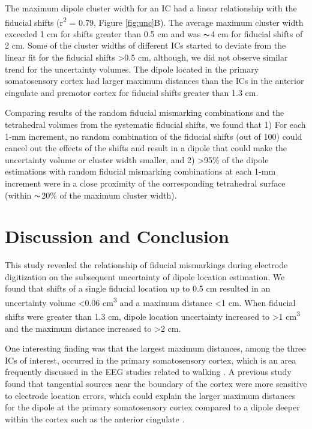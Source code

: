 \documentclass{UCF_ETD}
\newcommand{\tss}[1]{\textsuperscript{#1}}
\begin{document}
The maximum dipole cluster width for an IC had a linear relationship with the fiducial shifts (r\tss{2} = 0.79, Figure \ref{fig:unc}B). The average maximum cluster width exceeded 1 cm for shifts greater than 0.5 cm and was $\thicksim$4 cm for fiducial shifts of 2 cm. Some of the cluster widths of different ICs started to deviate from the linear fit for the fiducial shifts >0.5 cm, although, we did not observe similar trend for the uncertainty volumes. The dipole located in the primary somatosensory cortex had larger maximum distances than the ICs in the anterior cingulate and premotor cortex for fiducial shifts greater than 1.3 cm.

Comparing results of the random fiducial mismarking combinations and the tetrahedral volumes from the systematic fiducial shifts, we found that 1) For each 1-mm increment, no random combination of the fiducial shifts (out of 100) could cancel out the effects of the shifts and result in a dipole that could make the uncertainty volume or cluster width smaller, and 2) >95\% of the dipole estimations with random fiducial mismarking combinations at each 1-mm increment were in a close proximity of the corresponding tetrahedral surface (within $\thicksim$20\% of the maximum cluster width).

\section{Discussion and Conclusion}
This study revealed the relationship of fiducial mismarkings during electrode digitization on the subsequent uncertainty of dipole location estimation. We found that shifts of a single fiducial location up to 0.5 cm resulted in an uncertainty volume <0.06 cm\tss{3} and a maximum distance <1 cm. When fiducial shifts were greater than 1.3 cm, dipole location uncertainty increased to >1 cm\tss{3} and the maximum distance increased to >2 cm.

One interesting finding was that the largest maximum distances, among the three ICs of interest,  occurred in the primary somatosensory cortex, which is an area frequently discussed in the EEG studies related to walking \cite{Peterson2018-ht,Luu2017-ph}. A previous study found that tangential sources near the boundary of the cortex were more sensitive to electrode location errors, which could explain the larger maximum distances for the dipole at the primary somatosensory cortex compared to a dipole deeper within the cortex such as the anterior cingulate \cite{Beltrachini2011-je}.
\end{document}
